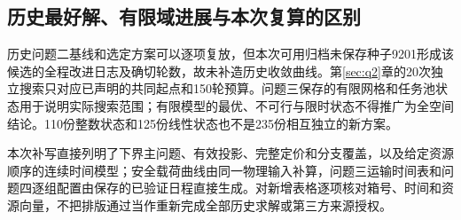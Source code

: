 \subsection{历史最好解、有限域进展与本次复算的区别}
历史问题二基线和选定方案可以逐项复放，但本次可用归档未保存种子9201形成该候选的全程改进日志及确切轮数，故未补造历史收敛曲线。第\ref{sec:q2}章的20次独立搜索只对应已声明的共同起点和150轮预算。问题三保存的有限网格和任务池状态用于说明实际搜索范围；有限模型的最优、不可行与限时状态不得推广为全空间结论。110份整数状态和125份线性状态也不是235份相互独立的新方案。

本次补写直接列明了下界主问题、有效投影、完整定价和分支覆盖，以及给定资源顺序的连续时间模型；安全载荷曲线由同一物理输入补算，问题三运输时间表和问题四逐组配置由保存的已验证日程直接生成。对新增表格逐项核对箱号、时间和资源向量，不把排版通过当作重新完成全部历史求解或第三方来源授权。
